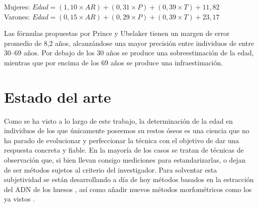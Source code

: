 \documentclass[a4paper,11pt]{article}
\begin{document}
\begin{center}
Mujeres: $Edad=(1,10\times AR)+(0,31\times P)+(0,39\times T)+11,82$\\
Varones: $Edad=(0,15\times AR)+(0,29\times P)+(0,39\times T)+23,17$
\end{center}

Las fórmulas propuestas por Prince y Ubelaker tienen un margen de error promedio de 8,2 años, alcanzándose una mayor precisión entre individuos de entre 30–69 años. Por debajo de los 30 años se produce una sobreestimación de la edad, mientras que por encima de los 69 años se produce una infraestimación.
\part{Estado del arte}
Como se ha visto a lo largo de este trabajo, la determinación de la edad en individuos de los que únicamente poseemos su restos óseos es una ciencia que no ha parado de evolucionar y perfeccionar la técnica con el objetivo de dar una respuesta concreta y fiable. En la mayoría de los casos se tratan de técnicas de observación que, si bien llevan consigo mediciones para estandarizarlas, o dejan de ser métodos sujetos al criterio del investigador. Para solventar esta subjetividad se están desarrollando a día de hoy métodos basados en la estracción del ADN de los huesos \cite{monzon2018estudio}, así como añadir nuevos métodos morfométricos como los ya vistos \cite{real2020determinacion}.
\newpage

\end{document}
